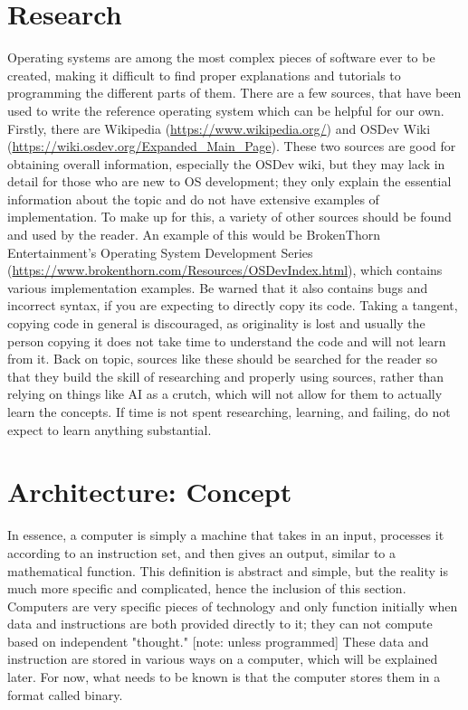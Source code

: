\documentclass[openany, 12px]{book}
\begin{document}
\section{Research}
Operating systems are among the most complex pieces of software ever to be created, making it difficult to find proper explanations and tutorials to programming the different parts of them. There are a few sources, that have been used to write the reference operating system which can be helpful for our own. Firstly, there are Wikipedia (\url{https://www.wikipedia.org/}) and OSDev Wiki (\url{https://wiki.osdev.org/Expanded_Main_Page}). These two sources are good for obtaining overall information, especially the OSDev wiki, but they may lack in detail for those who are new to OS development; they only explain the essential information about the topic and do not have extensive examples of implementation. To make up for this, a variety of other sources should be found and used by the reader. An example of this would be BrokenThorn Entertainment's Operating System Development Series (\url{https://www.brokenthorn.com/Resources/OSDevIndex.html}), which contains various implementation examples. Be warned that it also contains bugs and incorrect syntax, if you are expecting to directly copy its code. Taking a tangent, copying code in general is discouraged, as originality is lost and usually the person copying it does not take time to understand the code and will not learn from it. Back on topic, sources like these should be searched for the reader so that they build the skill of researching and properly using sources, rather than relying on things like AI as a crutch, which will not allow for them to actually learn the concepts. If time is not spent researching, learning, and failing, do not expect to learn anything substantial.

\section{Architecture: Concept}
In essence, a computer is simply a machine that takes in an input, processes it according to an instruction set, and then gives an output, similar to a mathematical function. This definition is abstract and simple, but the reality is much more specific and complicated, hence the inclusion of this section. Computers are very specific pieces of technology and only function initially when data and instructions are both provided directly to it; they can not compute based on independent "thought." [note: unless programmed] These data and instruction are stored in various ways on a computer, which will be explained later. For now, what needs to be known is that the computer stores them in a format called binary.
\end{document}
